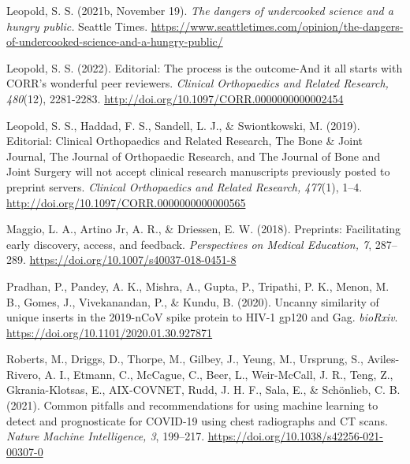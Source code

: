 \documentclass[authordate, perspective]{jote-new-article}
\begin{document}
	Leopold, S. S. (2021b, November 19). \emph{The dangers of undercooked science and a hungry public.} Seattle Times. \url{https://www.seattletimes.com/opinion/the-dangers-of-undercooked-science-and-a-hungry-public/}







	Leopold, S. S. (2022). Editorial: The process is the outcome-And it all starts with CORR's wonderful peer reviewers. \emph{Clinical Orthopaedics and Related Research, 480}(12), 2281-2283. \url{http://doi.org/10.1097/CORR.0000000000002454}







	Leopold, S. S., Haddad, F. S., Sandell, L. J., \& Swiontkowski, M. (2019). Editorial: Clinical Orthopaedics and Related Research, The Bone \& Joint Journal, The Journal of Orthopaedic Research, and The Journal of Bone and Joint Surgery will not accept clinical research manuscripts previously posted to preprint servers. \emph{Clinical Orthopaedics and Related Research, 477}(1), 1--4. \url{http://doi.org/10.1097/CORR.0000000000000565}







	Maggio, L. A., Artino Jr, A. R., \& Driessen, E. W. (2018). Preprints: Facilitating early discovery, access, and feedback. \emph{Perspectives on Medical Education, 7}, 287--289. \url{https://doi.org/10.1007/s40037-018-0451-8}







	Pradhan, P., Pandey, A. K., Mishra, A., Gupta, P., Tripathi, P. K., Menon, M. B., Gomes, J., Vivekanandan, P., \& Kundu, B. (2020). Uncanny similarity of unique inserts in the 2019-nCoV spike protein to HIV-1 gp120 and Gag. \emph{bioRxiv}. \url{https://doi.org/10.1101/2020.01.30.927871}







	Roberts, M., Driggs, D., Thorpe, M., Gilbey, J., Yeung, M., Ursprung, S., Aviles-Rivero, A. I., Etmann, C., McCague, C., Beer, L., Weir-McCall, J. R., Teng, Z., Gkrania-Klotsas, E., AIX-COVNET, Rudd, J. H. F., Sala, E., \& Schönlieb, C. B. (2021). Common pitfalls and recommendations for using machine learning to detect and prognosticate for COVID-19 using chest radiographs and CT scans. \emph{Nature Machine Intelligence, 3}, 199--217. \url{https://doi.org/10.1038/s42256-021-00307-0}
\end{document}
